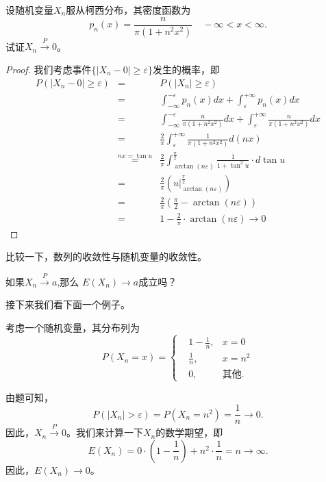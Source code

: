 \begin{example}
设随机变量$X_n$服从柯西分布，其密度函数为
$$p_{n}(x)=\frac{n}{\pi\left(1+n^{2} x^{2}\right)} \quad-\infty<x<\infty.$$
试证$X_{n} \stackrel{P}{\rightarrow} 0$。
\end{example}
\begin{proof}
我们考虑事件$\{|X_n - 0|\geq  \varepsilon\}$发生的概率，即
\begin{eqnarray*}
P\left(\left|X_{n}-0\right| \geq \varepsilon\right) &=&P\left(\left|X_{n}\right| \geqslant \varepsilon\right) \\
&=&\int_{-\infty}^{-\varepsilon} p_{n}(x) d x+\int_{\varepsilon}^{+\infty} p_{n}(x) d x \\
&=&\int_{-\infty}^{-\varepsilon} \frac{n}{\pi\left(1+n^{2} x^{2}\right)} d x+\int_{\varepsilon}^{+\infty} \frac{n}{\pi\left(1+n^{2} x^{2}\right)} d x \\
&=&\frac{2}{\pi} \int_{\varepsilon}^{+\infty} \frac{1}{\pi\left(1+n^{2} x^{2}\right)} d(n x) \\
&\overset{{n x=\tan u}}{=} & \frac{2}{\pi} 
\int_{\operatorname{arctan}(n \varepsilon)}^{\frac{\pi}{2}} \frac{1}{1+\tan ^{2} u} \cdot d \operatorname{tan}u\\
&=&\frac{2}{\pi}\left(\left.u\right|_{\arctan (n \varepsilon)} ^{\frac{\pi}{2}}\right) \\
&=&\frac{2}{\pi}\left(\frac{\pi}{2}-\arctan (n \varepsilon)\right) \\
&=& 1-\frac{2}{\pi} \cdot \arctan (n \varepsilon) \rightarrow 0
\end{eqnarray*}
\end{proof}


\begin{problem}
    比较一下，数列的收敛性与随机变量的收敛性。
    \vspace{5cm}
\end{problem}

\begin{problem}
    如果$X_{n} \stackrel{P}{\rightarrow} a $,那么 $E\left(X_{n}\right) \rightarrow a$成立吗？
\end{problem}

接下来我们看下面一个例子。
\begin{example}
考虑一个随机变量，其分布列为
$$P\left(X_{n}=x\right)=\left\{\begin{aligned}
&1-\frac{1}{n}, & x=0 \\
&\frac{1}{n}, & x=n^{2} \\
&0, & \text{其他}.
\end{aligned}\right.$$
\end{example}
\begin{solution}
由题可知，$$P\left(\left|X_{n}\right|>\varepsilon\right)=P\left(X_{n}=n^{2}\right)=\frac{1}{n} \rightarrow 0.$$
因此，$X_{n} \stackrel{P}{\rightarrow} 0$。我们来计算一下$X_n$的数学期望，即
$$E\left(X_{n}\right)=0 \cdot\left(1-\frac{1}{n}\right)+n^{2} \cdot \frac{1}{n}=n \rightarrow \infty. $$
因此，$E\left(X_{n}\right) \rightarrow 0$。
\end{solution}

